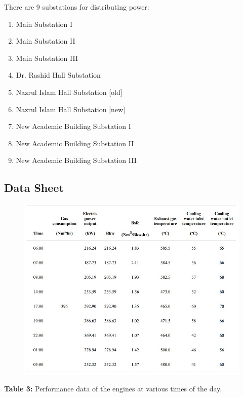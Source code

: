 \documentclass[12pt]{article}
\begin{document}
          There are 9 substations for distributing power: 
          \begin{multicols}{2}
            \begin{enumerate}
              \item Main Substation I 
              \item Main Substation II
              \item Main Substation III
              \item Dr. Rashid Hall Substation 
              \item Nazrul Islam Hall Substation [old]
              \item Nazrul Islam Hall Substation [new]
              \item New Academic Building Substation I 
              \item New Academic Building Substation II
              \item New Academic Building Substation III
            \end{enumerate}
          \end{multicols}

          \subsection*{Data Sheet}
          \begin{figure}[H]
            \begin{center}
              \includegraphics[width=0.98\linewidth]{img/data_table.jpeg}
            \end{center}
          \end{figure}
          \begin{center}
            \textbf{Table 3:} Performance data of the engines at various times of the day. 
          \end{center}
\end{document}
